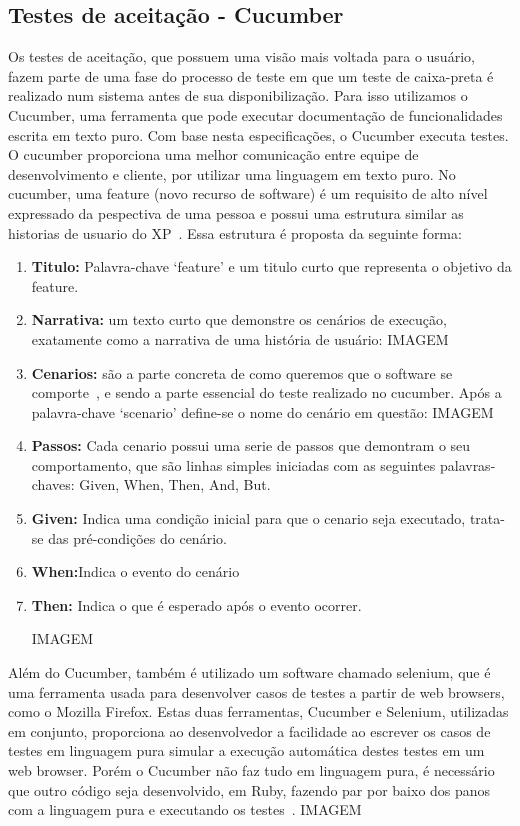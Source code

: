 \subsection{Testes de aceitação - Cucumber}
Os testes de aceitação, que possuem uma visão mais voltada para o usuário, fazem 
parte de uma fase do processo de teste em que um teste de caixa-preta é realizado 
num sistema antes de sua disponibilização. Para isso utilizamos o Cucumber, uma 
ferramenta que pode executar documentação de funcionalidades escrita em texto puro. 
Com base nesta especificações, o Cucumber executa testes.
%
O cucumber proporciona uma melhor comunicação entre equipe de desenvolvimento e 
cliente, por utilizar uma linguagem  em texto puro.
%
No cucumber, uma feature (novo recurso de software) é um requisito de alto nível 
expressado da pespectiva de uma pessoa e possui uma estrutura similar as historias 
de usuario do XP~\cite{chelimsky2010}. Essa estrutura é proposta da seguinte forma:
\begin{enumerate}
\item \textbf{Titulo:} Palavra-chave ‘feature’ e um titulo curto que representa o 
objetivo da feature.
\item \textbf{Narrativa:} um texto curto que demonstre os cenários de execução, 
exatamente como a narrativa de uma história de usuário:
IMAGEM
%
\item \textbf{Cenarios:} são a parte concreta de como queremos que o software se 
comporte~\cite{chelimsky2010}, e sendo a parte essencial do teste realizado no 
cucumber. Após a palavra-chave ‘scenario’ define-se o nome do cenário em questão:
IMAGEM
%
\item \textbf{Passos:} Cada cenario possui uma serie de passos que demontram o seu 
comportamento, que são linhas simples iniciadas com as seguintes palavras-chaves: 
Given, When, Then, And, But.
\item \textbf{Given:} Indica uma condição inicial para que o cenario seja executado, 
trata-se das pré-condições do cenário.
\item \textbf{When:}Indica o evento do cenário
\item \textbf{Then:} Indica o que é esperado após o evento ocorrer.

IMAGEM
\end{enumerate}
Além do Cucumber, também é utilizado um software chamado selenium, que é uma ferramenta
usada para desenvolver casos de testes a partir de web browsers, como o Mozilla Firefox. 
Estas duas ferramentas, Cucumber e Selenium, utilizadas em conjunto, proporciona ao desenvolvedor
a facilidade ao escrever os casos de testes em linguagem pura simular a execução automática
destes testes em um web browser.
%
Porém o Cucumber não faz tudo em linguagem pura, é necessário que outro código seja desenvolvido,
em Ruby, fazendo par por baixo dos panos com a linguagem pura e executando os testes~\cite{akita2011}.
IMAGEM

